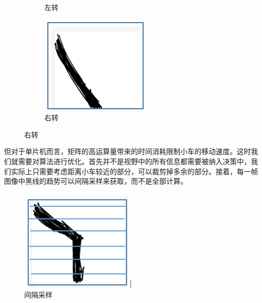 \documentclass{paper}
\begin{document}
\begin{figure}[ht]
\begin{subfigure}[b]{0.3\textwidth}
   \caption{左转}
   \label{fig:label}
 \end{subfigure}
 \hfill
 \begin{subfigure}[b]{0.3\textwidth}
   \centering
   \includegraphics[width=\textwidth]{figures/left.png}
   \caption{右转}
   \label{fig:label}
 \end{subfigure}
 \hfill
\end{figure}

但对于单片机而言，矩阵的高运算量带来的时间消耗限制小车的移动速度。这时我们就需要对算法进行优化。首先并不是视野中的所有信息都需要被纳入决策中，我们实际上只需要考虑距离小车较近的部分，可以裁剪掉多余的部分。接着，每一帧图像中黑线的趋势可以间隔采样来获取，而不是全部计算。

\begin{figure}[ht]
  \centering
  \includegraphics[width=0.5\textwidth]{figures/jumpscan.png}
  \caption{间隔采样 }
\end{figure}
\end{document}
